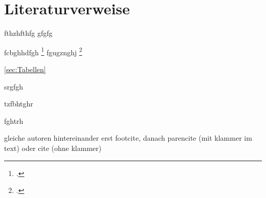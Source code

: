 \section{Literaturverweise}
\label{sec:Literaturverweise}


fthzhfthfg \cite{Giruc2011} gfgfg

fcbghhdfgh \footcite[45]{Ochsenbein2005} fgugznghj \footcite{Ochsenbein2005}

\ref{sec:Tabellen}

srgfgh \textcite{Ochsenbein2005}

tzfbhtghr \parencite{Ochsenbein2005}

fghtrh 

gleiche autoren hintereinander erst footcite, danach parencite (mit klammer im text) oder cite (ohne klammer)